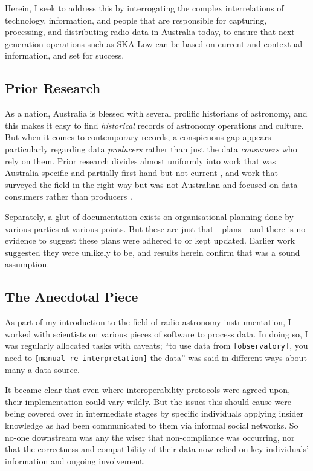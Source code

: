 \documentclass[11pt,twoside]{article}
\begin{document}
Herein, I seek to address this by interrogating the complex interrelations of technology, information, and people that are responsible for capturing, processing, and distributing radio data in Australia today, to ensure that next-generation operations such as SKA-Low can be based on current and contextual information, and set for success.

\subsection{Prior Research}

As a nation, Australia is blessed with several prolific historians of astronomy, and this makes it easy to find \textit{historical} records of astronomy operations and culture. But when it comes to contemporary records, a conspicuous gap appears---particularly regarding data \textit{producers} rather than just the data \textit{consumers} who rely on them. Prior research divides almost uniformly into work that was Australia-specific and partially first-hand but not current \citep[e.g.][]{orchiston2021golden,schilizzi2024square}, and work that surveyed the field in the right way but was not Australian and focused on data consumers rather than producers \citep[e.g.][]{ZUIDERWIJK2019228,Borgman2021From}.

Separately, a glut of documentation exists on organisational planning done by various parties at various points. But these are just that---plans---and there is no evidence to suggest these plans were adhered to or kept updated. Earlier work suggested they were unlikely to be, and results herein confirm that was a sound assumption.

\subsection{The Anecdotal Piece}

As part of my introduction to the field of radio astronomy instrumentation, I worked with scientists on various pieces of software to process data. In doing so, I was regularly allocated tasks with caveats; ``to use data from \texttt{[observatory]}, you need to \texttt{[manual re-interpretation]} the data'' was said in different ways about many a data source.

It became clear that even where interoperability protocols were agreed upon, their implementation could vary wildly. But the issues this should cause were being covered over in intermediate stages by specific individuals applying insider knowledge as had been communicated to them via informal social networks. So no-one downstream was any the wiser that non-compliance was occurring, nor that the correctness and compatibility of their data now relied on key individuals' information and ongoing involvement.
\end{document}
